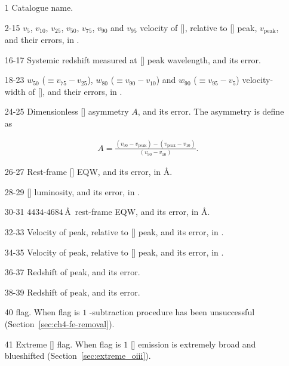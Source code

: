 \begin{itemize}

  \item[1] Catalogue name.

  \item[2-15] $v_{5}$, $v_{10}$, $v_{25}$, $v_{50}$, $v_{75}$, $v_{90}$ and $v_{95}$ velocity of [], relative to [] peak, $v_{\text{peak}}$, and their errors, in \kms.

  \item[16-17] Systemic redshift measured at [] peak wavelength, and its error.

  \item[18-23] $w_{50}$ ($\equiv v_{75} - v_{25}$), $w_{80}$ ($\equiv v_{90} - v_{10}$) and $w_{90}$ ($\equiv v_{95} - v_{5}$) velocity-width of [], and their errors, in \kms.

  \item[24-25] Dimensionless [] asymmetry $A$, and its error. The asymmetry is define as

  \begingroup\makeatletter{}\check@mathfonts
   \begin{eqnarray}
    A = \frac{(v_{90} - v_{\text{peak}}) - (v_{\text{peak}} - v_{10})}{(v_{90} - v_{10})} \nonumber.
    \end{eqnarray}
  \endgroup

  \item[26-27] Rest-frame [] EQW, and its error, in \AA.

  \item[28-29] [\ion{O}{III}] luminosity, and its error, in \ergs.

  \item[30-31] $4434$-$4684$\,\AA\, rest-frame  EQW, and its error, in \AA.

  \item[32-33] Velocity of \hb peak, relative to [] peak, and its error, in \kms.

  \item[34-35] Velocity of \ha peak, relative to [] peak, and its error, in \kms.

  \item[36-37] Redshift of \hb peak, and its error.

  \item[38-39] Redshift of \ha peak, and its error.

  \item[40]  flag. When flag is $1$ -subtraction procedure has been unsuccessful (Section~\ref{sec:ch4-fe-removal}).

  \item[41] Extreme [] flag. When flag is $1$ [] emission is extremely broad and blueshifted (Section~\ref{sec:extreme_oiii}).

\end{itemize}

